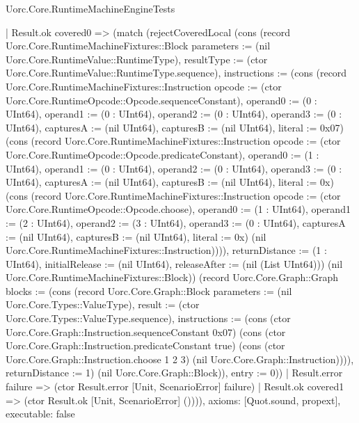 \begin{lexlean}{Uorc.Core.RuntimeMachineEngineTests}
\begin{semanticmodule}
{    | Result.ok covered0 => (match (rejectCoveredLocal (cons (record Uorc.Core.RuntimeMachineFixtures::Block {parameters := (nil Uorc.Core.RuntimeValue::RuntimeType), resultType := (ctor Uorc.Core.RuntimeValue::RuntimeType.sequence), instructions := (cons (record Uorc.Core.RuntimeMachineFixtures::Instruction {opcode := (ctor Uorc.Core.RuntimeOpcode::Opcode.sequenceConstant), operand0 := (0 : UInt64), operand1 := (0 : UInt64), operand2 := (0 : UInt64), operand3 := (0 : UInt64), capturesA := (nil UInt64), capturesB := (nil UInt64), literal := 0x07}) (cons (record Uorc.Core.RuntimeMachineFixtures::Instruction {opcode := (ctor Uorc.Core.RuntimeOpcode::Opcode.predicateConstant), operand0 := (1 : UInt64), operand1 := (0 : UInt64), operand2 := (0 : UInt64), operand3 := (0 : UInt64), capturesA := (nil UInt64), capturesB := (nil UInt64), literal := 0x}) (cons (record Uorc.Core.RuntimeMachineFixtures::Instruction {opcode := (ctor Uorc.Core.RuntimeOpcode::Opcode.choose), operand0 := (1 : UInt64), operand1 := (2 : UInt64), operand2 := (3 : UInt64), operand3 := (0 : UInt64), capturesA := (nil UInt64), capturesB := (nil UInt64), literal := 0x}) (nil Uorc.Core.RuntimeMachineFixtures::Instruction)))), returnDistance := (1 : UInt64), initialRelease := (nil UInt64), releaseAfter := (nil (List UInt64))}) (nil Uorc.Core.RuntimeMachineFixtures::Block)) (record Uorc.Core.Graph::Graph {blocks := (cons (record Uorc.Core.Graph::Block {parameters := (nil Uorc.Core.Types::ValueType), result := (ctor Uorc.Core.Types::ValueType.sequence), instructions := (cons (ctor Uorc.Core.Graph::Instruction.sequenceConstant 0x07) (cons (ctor Uorc.Core.Graph::Instruction.predicateConstant true) (cons (ctor Uorc.Core.Graph::Instruction.choose 1 2 3) (nil Uorc.Core.Graph::Instruction)))), returnDistance := 1}) (nil Uorc.Core.Graph::Block)), entry := 0}))
      | Result.error failure => (ctor Result.error [Unit, ScenarioError] failure)
      | Result.ok covered1 => (ctor Result.ok [Unit, ScenarioError] ()))),
  axioms: [Quot.sound, propext],
  executable: false
}


\end{semanticmodule}
\end{lexlean}
